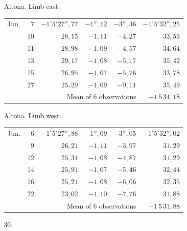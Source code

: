 \noindent\begin{minipage}[t]{.495\textwidth}\centering Altona. Limb east.\par\smallskip
{\scriptsize\setlength{\tabcolsep}{1pt}\renewcommand{\arraystretch}{1.2}\begin{tabular}{lr|r|r|r|r|}
Jun.&7&$-1^\circ5'27''{,}77$&$-1''{,}12$&$-3''{,}36$&$-1^\circ5'32''{,}25$\\
&10&$28{,}15$&$-1{,}11$&$-4{,}27$&$33{,}53$\\
&11&$28{,}98$&$-1{,}09$&$-4{,}57$&$34{,}64$\\
&13&$29{,}17$&$-1{,}08$&$-5{,}17$&$35{,}42$\\
&15&$26{,}95$&$-1{,}07$&$-5{,}76$&$33{,}78$\\
&27&$25{,}29$&$-1{,}09$&$-9{,}11$&$35{,}49$\\
\cline{6-6}\multicolumn{5}{r}{Mean of 6 observations}&$-1\,5\,34{,}18$
\end{tabular}}\end{minipage}\hfill\begin{minipage}[t]{.495\textwidth}\centering Altona. Limb west.\par\smallskip
{\scriptsize\setlength{\tabcolsep}{1pt}\renewcommand{\arraystretch}{1.2}\begin{tabular}{lr|r|r|r|r}
Jun.&6&$-1^\circ5'27''{,}88$&$-1''{,}09$&$-3''{,}05$&$-1^\circ5'32''{,}02$\\
&9&$26{,}21$&$-1{,}11$&$-3{,}97$&$31{,}29$\\
&12&$25{,}34$&$-1{,}08$&$-4{,}87$&$31{,}29$\\
&14&$25{,}91$&$-1{,}07$&$-5{,}46$&$32{,}44$\\
&16&$25{,}21$&$-1{,}08$&$-6{,}06$&$32{,}35$\\
&22&$23{,}02$&$-1{,}10$&$-7{,}76$&$31{,}88$\\
\cline{6-6}\multicolumn{5}{r}{Mean of 6 observations}&$-1\,5\,31{,}88$
\end{tabular}}\end{minipage}
\par\vspace{4mm}
\begin{center}30.\end{center}

